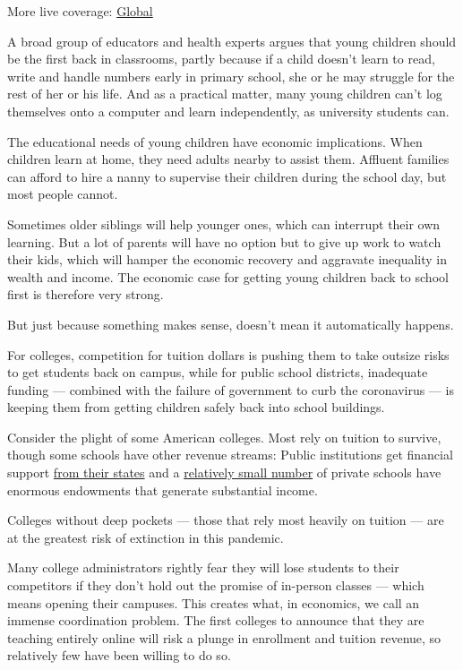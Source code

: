 More live coverage:
\href{https://www.nytimes.com/2020/08/04/world/coronavirus-cases.html?action=click\&pgtype=Article\&state=default\&region=MAIN_CONTENT_1\&context=storylines_live_updates}{Global}

A broad group of educators and health experts argues that young children
should be the first back in classrooms, partly because if a child
doesn't learn to read, write and handle numbers early in primary school,
she or he may struggle for the rest of her or his life. And as a
practical matter, many young children can't log themselves onto a
computer and learn independently, as university students can.

The educational needs of young children have economic implications. When
children learn at home, they need adults nearby to assist them. Affluent
families can afford to hire a nanny to supervise their children during
the school day, but most people cannot.

Sometimes older siblings will help younger ones, which can interrupt
their own learning. But a lot of parents will have no option but to give
up work to watch their kids, which will hamper the economic recovery and
aggravate inequality in wealth and income. The economic case for getting
young children back to school first is therefore very strong.

But just because something makes sense, doesn't mean it automatically
happens.

For colleges, competition for tuition dollars is pushing them to take
outsize risks to get students back on campus, while for public school
districts, inadequate funding --- combined with the failure of
government to curb the coronavirus --- is keeping them from getting
children safely back into school buildings.

Consider the plight of some American colleges. Most rely on tuition to
survive, though some schools have other revenue streams: Public
institutions get financial support
\href{https://research.collegeboard.org/trends/college-pricing/figures-tables/total-and-student-state-and-local-funding-and-public-enrollment-over-time}{from
their states} and a
\href{https://research.collegeboard.org/pdf/2019-trendsincp-fig-19.pdf}{relatively
small number} of private schools have enormous endowments that generate
substantial income.

Colleges without deep pockets --- those that rely most heavily on
tuition --- are at the greatest risk of extinction in this pandemic.

Many college administrators rightly fear they will lose students to
their competitors if they don't hold out the promise of in-person
classes --- which means opening their campuses. This creates what, in
economics, we call an immense coordination problem. The first colleges
to announce that they are teaching entirely online will risk a plunge in
enrollment and tuition revenue, so relatively few have been willing to
do so.

